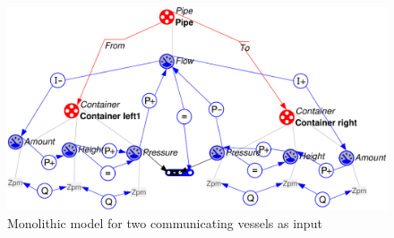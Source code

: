 \documentclass{article} %
\begin{document}


\begin{figure}[ht]
\centering
\includegraphics[scale=0.5]{cv2_mono-crop.pdf}
\caption{Monolithic model for two communicating vessels as input}
\label{cv_mono}
\end{figure}
\end{document}
